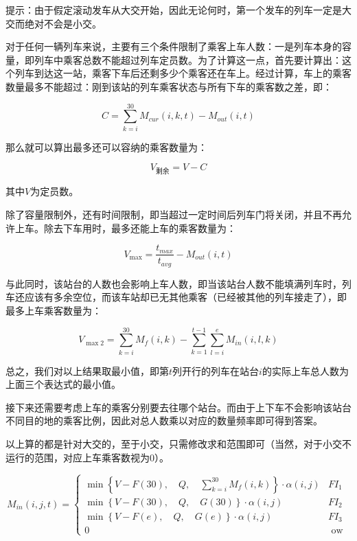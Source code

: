 提示：由于假定滚动发车从大交开始，因此无论何时，第一个发车的列车一定是大交而绝对不会是小交。

对于任何一辆列车来说，主要有三个条件限制了乘客上车人数：一是列车本身的容量，即列车中乘客总数不能超过列车定员数。为了计算这一点，首先要计算出：这个列车到达这一站，乘客下车后还剩多少个乘客还在车上。经过计算，车上的乘客数量最多不能超过：刚到该站的列车乘客状态与所有下车的乘客数之差，即：

\begin{equation}
C = \sum _{k = i} ^{30} M_{cur}(i, k, t) - M_{out}(i, t)
\end{equation}

那么就可以算出最多还可以容纳的乘客数量为：

\begin{equation}
    V_{\text{剩余}} = V-C
\end{equation}

其中$V$为定员数。

除了容量限制外，还有时间限制，即当超过一定时间后列车门将关闭，并且不再允许上车。除去下车用时，最多还能上车的乘客数量为：

\begin{equation}
V_{\max} = \frac {t_{max}} {t_{avg}} - M_{out}(i, t)
\end{equation}

与此同时，该站台的人数也会影响上车人数，即当该站台人数不能填满列车时，列车还应该有多余空位，而该车站却已无其他乘客（已经被其他的列车接走了），即最多上车乘客数量为：

\begin{equation}
V_{\max2} = \sum _{k = i} ^{30} M_f(i, k) - \sum _{k = 1} ^{t - 1} \sum _{l = i} ^{e} M_{in}(i, l, k)
\end{equation}

总之，我们对以上结果取最小值，即第$t$列开行的列车在站台$i$的实际上车总人数为上面三个表达式的最小值。

接下来还需要考虑上车的乘客分别要去往哪个站台。而由于上下车不会影响该站台不同目的地的乘客比例，因此对总人数乘以对应的数量频率即可得到答案。

以上算的都是针对大交的，至于小交，只需修改求和范围即可（当然，对于小交不运行的范围，对应上车乘客数视为$0$）。

\begin{equation}
M_{in}(i, j, t) = 
	\begin{cases}
	\min \left\{
	 	V - F(30), \quad
	  	Q, \quad
	  	\sum _{k = i} ^{30} M_f(i, k)
	\right\} \cdot \alpha(i, j) &  FI_1\\
	\min \left\{
	 	V - F(30), \quad
	  	Q, \quad
        G(30)
	\right\} \cdot \alpha(i, j) &  FI_2\\
	\min \left\{
	 	V - F(e), \quad
	  	Q, \quad
        G(e)
	\right\} \cdot \alpha(i, j) &  FI_3\\
	0 & \text{ ow } 
	\end{cases}
\end{equation}

